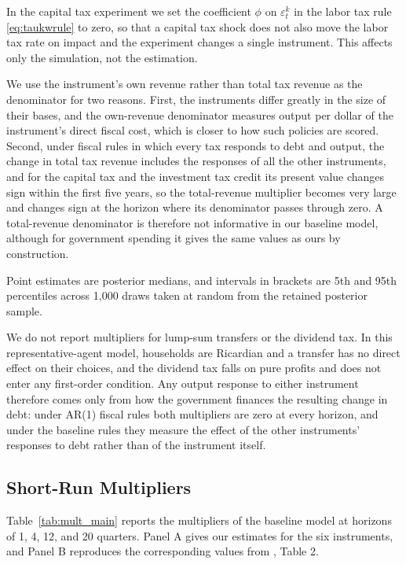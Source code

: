 \documentclass[article,11pt,letterpaper,fleqn]{article}
\theoremstyle{definition}
\numberwithin{equation}{section}
\begin{document}
In the capital tax experiment we set the coefficient $\phi$ on $\varepsilon_t^k$ in the labor tax rule \eqref{eq:taukwrule} to zero, so that a capital tax shock does not also move the labor tax rate on impact and the experiment changes a single instrument. This affects only the simulation, not the estimation.

We use the instrument's own revenue rather than total tax revenue as the denominator for two reasons. First, the instruments differ greatly in the size of their bases, and the own-revenue denominator measures output per dollar of the instrument's direct fiscal cost, which is closer to how such policies are scored. Second, under fiscal rules in which every tax responds to debt and output, the change in total tax revenue includes the responses of all the other instruments, and for the capital tax and the investment tax credit its present value changes sign within the first five years, so the total-revenue multiplier becomes very large and changes sign at the horizon where its denominator passes through zero. A total-revenue denominator is therefore not informative in our baseline model, although for government spending it gives the same values as ours by construction.

Point estimates are posterior medians, and intervals in brackets are 5th and 95th percentiles across 1{,}000 draws taken at random from the retained posterior sample.

We do not report multipliers for lump-sum transfers or the dividend tax. In this representative-agent model, households are Ricardian and a transfer has no direct effect on their choices, and the dividend tax falls on pure profits and does not enter any first-order condition. Any output response to either instrument therefore comes only from how the government finances the resulting change in debt: under AR(1) fiscal rules both multipliers are zero at every horizon, and under the baseline rules they measure the effect of the other instruments' responses to debt rather than of the instrument itself.


\subsection{Short-Run Multipliers}

Table~\ref{tab:mult_main} reports the multipliers of the baseline model at horizons of 1, 4, 12, and 20 quarters. Panel A gives our estimates for the six instruments, and Panel B reproduces the corresponding values from \citet{Zubairy2014}, Table 2.
\end{document}
